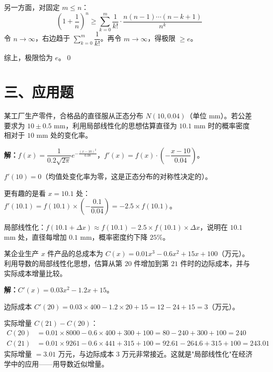 \documentclass[12pt, a4paper]{ctexart}
\begin{document}
另一方面，对固定 $m \leq n$：
\[
\left(1 + \frac{1}{n}\right)^n \geq \sum_{k=0}^{m} \frac{1}{k!} \cdot \frac{n(n-1)\cdots(n-k+1)}{n^k}
\]
令 $n \to \infty$，右边趋于 $\displaystyle\sum_{k=0}^{m} \dfrac{1}{k!}$。再令 $m \to \infty$，得极限 $\geq e$。

综上，极限恰为 $e$。\qed

\section*{\textcolor{apppurple}{三、应用题}}

\begin{appbox}[【应用1】工程中的线性近似]
某工厂生产零件，合格品的直径服从正态分布 $N(10, 0.04)$（单位 mm）。若公差要求为 $10 \pm 0.5$ mm，利用局部线性化的思想估算直径为 $10.1$ mm 时的概率密度相对于 $10$ mm 处的变化率。
\end{appbox}

\textbf{解：}$f(x) = \dfrac{1}{0.2\sqrt{2\pi}} e^{-\frac{(x-10)^2}{0.08}}$，$f'(x) = f(x) \cdot \left(-\dfrac{x-10}{0.04}\right)$。

$f'(10) = 0$（均值处变化率为零，这是正态分布的对称性决定的）。

更有趣的是看 $x = 10.1$ 处：$f'(10.1) = f(10.1) \times \left(-\dfrac{0.1}{0.04}\right) = -2.5 \times f(10.1)$。

局部线性化：$f(10.1 + \Delta x) \approx f(10.1) - 2.5 \times f(10.1) \times \Delta x$，说明在 $10.1$ mm 处，直径每增加 $0.1$ mm，概率密度约下降 $25\%$。

\begin{appbox}[【应用2】经济中的边际分析]
某企业生产 $x$ 件产品的总成本为 $C(x) = 0.01x^3 - 0.6x^2 + 15x + 100$（万元）。利用导数的局部线性化思想，估算从第 $20$ 件增加到第 $21$ 件时的边际成本，并与实际成本增量比较。
\end{appbox}

\textbf{解：}$C'(x) = 0.03x^2 - 1.2x + 15$。

边际成本 $C'(20) = 0.03 \times 400 - 1.2 \times 20 + 15 = 12 - 24 + 15 = 3$（万元）。

实际增量 $C(21) - C(20)$：
\begin{align*}
C(20) &= 0.01 \times 8000 - 0.6 \times 400 + 300 + 100 = 80 - 240 + 300 + 100 = 240 \\
C(21) &= 0.01 \times 9261 - 0.6 \times 441 + 315 + 100 = 92.61 - 264.6 + 315 + 100 = 243.01
\end{align*}
实际增量 $= 3.01$ 万元，与边际成本 $3$ 万元非常接近。这就是"局部线性化"在经济学中的应用——用导数近似增量。
\end{document}
